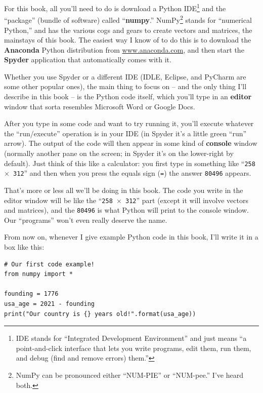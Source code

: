 For this book, all you'll need to do is download a Python IDE\footnote{IDE
stands for ``Integrated Development Environment'' and just means ``a
point-and-click interface that lets you write programs, edit them, run them,
and debug (find and remove errors) them.''} and the ``package'' (bundle of
software) called ``\textbf{numpy}.'' NumPy\footnote{NumPy can be pronounced
either ``NUM-PIE'' or ``NUM-pee.'' I've heard both.} stands for ``numerical
Python,'' and has the various cogs and gears to create vectors and matrices,
the mainstays of this book. The easiest way I know of to do this is to download
the \textbf{Anaconda} Python distribution from \url{www.anaconda.com}, and then
start the \textbf{Spyder} application that automatically comes with it.

Whether you use Spyder or a different IDE (IDLE, Eclipse, and PyCharm are some
other popular ones), the main thing to focus on -- and the only thing I'll
describe in this book -- is the Python code itself, which you'll type in an
\textbf{editor} window that sorta resembles Microsoft Word or Google Docs.

After you type in some code and want to try running it, you'll execute whatever
the ``run/execute'' operation is in your IDE (in Spyder it's a little green
``run'' arrow). The output of the code will then appear in some kind of
\textbf{console} window (normally another pane on the screen; in Spyder it's on
the lower-right by default). Just think of this like a calculator: you first
type in something like ``\texttt{258 $\times$ 312}'' and then when you press
the equals sign (\texttt{=}) the answer \texttt{80496} appears.

That's more or less all we'll be doing in this book. The code you write in the
editor window will be like the ``\texttt{258 $\times$ 312}'' part (except it
will involve vectors and matrices), and the \texttt{80496} is what Python will
print to the console window. Our ``programs'' won't even really deserve the
name.

From now on, whenever I give example Python code in this book, I'll write it in
a box like this:


\label{firstPython}

\vspace{-.15in}
\begin{Verbatim}[fontsize=\small,samepage=true,frame=single,framesep=3mm]
# Our first code example!
from numpy import *

founding = 1776
usa_age = 2021 - founding
print("Our country is {} years old!".format(usa_age))
\end{Verbatim}
\vspace{-.15in}

